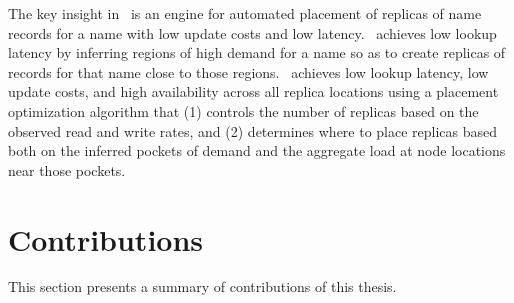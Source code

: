 { The key insight in \auspice\ is an engine for automated placement of replicas of name records for a name with low update costs and low latency. \auspice\ achieves low lookup latency by inferring regions of high demand for a name so as to create replicas of records for that name close to those regions. \auspice\ achieves low lookup latency,  low update costs, and high availability across all replica locations using a placement optimization algorithm that (1) controls the number of replicas based on the observed read and write rates, and (2) determines where to place replicas based both on the inferred pockets of demand and the aggregate load at node locations near those pockets. 
}


\section{Contributions}

This section presents a summary of contributions of this thesis. 


